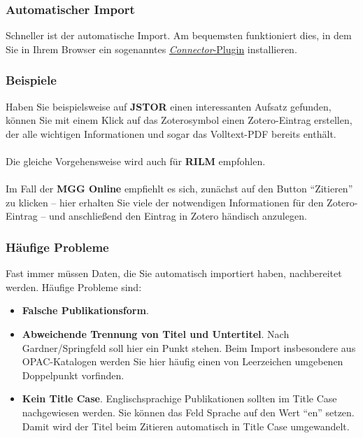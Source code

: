 \subsubsection*{Automatischer Import}
Schneller ist der automatische Import. Am bequemsten funktioniert dies, in dem Sie in Ihrem Browser ein sogenanntes \href{https://www.zotero.org/download/connectors}{\textit{Connector}-Plugin} installieren.

\subsubsection*{Beispiele}
Haben Sie beispielsweise auf \textbf{JSTOR} einen interessanten Aufsatz gefunden,
können Sie mit einem Klick auf das Zoterosymbol einen Zotero-Eintrag 
erstellen, der alle wichtigen Informationen und sogar das Volltext-PDF
bereits enthält.\\
~\\
Die gleiche Vorgehensweise wird auch für \textbf{RILM} empfohlen.\\
~\\
Im Fall der \textbf{MGG Online} empfiehlt es sich, zunächst auf den Button "`Zitieren"'
zu klicken -- hier erhalten Sie viele der notwendigen Informationen für den Zotero-Eintrag
-- und anschließend den Eintrag in Zotero händisch anzulegen.

\subsubsection{H\"aufige Probleme}\label{haeufige_probleme}
Fast immer müssen Daten, die Sie automatisch importiert haben, nachbereitet werden. 
Häufige Probleme sind:

\begin{itemize}
    \item \textbf{Falsche Publikationsform}.
    \item \textbf{Abweichende Trennung von Titel und Untertitel}. Nach Gardner/Springfeld soll hier ein Punkt stehen. Beim Import 
    insbesondere aus OPAC-Katalogen werden Sie hier häufig einen von Leerzeichen umgebenen Doppelpunkt vorfinden.    
    \item \textbf{Kein Title Case}. Englischsprachige Publikationen sollten im Title Case nachgewiesen werden. Sie können 
    das Feld Sprache auf den Wert "`en"' setzen. Damit wird der Titel beim Zitieren automatisch in Title Case umgewandelt.    
\end{itemize}
